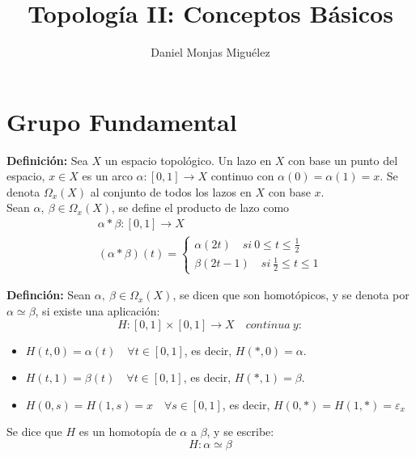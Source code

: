 \documentclass{article}
\author{Daniel Monjas Miguélez}
\title{Topología II: Conceptos Básicos}
\begin{document}
\maketitle
\newpage
\tableofcontents
\newpage

\section{Grupo Fundamental}
\textbf{Definición:} Sea $X$ un espacio topológico. Un lazo en $X$ con base un punto del espacio, $x\in X$ es un arco $\alpha:[0,1]\rightarrow X$ continuo con $\alpha(0)=\alpha(1)=x$. Se denota $\Omega_{x}(X)$ al conjunto de todos los lazos en $X$ con base $x$. \\

Sean $\alpha,\:\beta\in \Omega_{x}(X)$, se define el producto de lazo como
\begin{gather*}
\alpha*\beta:[0,1]\rightarrow X \\
(\alpha*\beta)(t)=\left\lbrace \begin{array}{c}
\alpha(2t)\quad si\:0\leq t\leq \frac{1}{2} \\
\beta(2t-1)\quad si\:\frac{1}{2}\leq t\leq 1
\end{array} \right.
\end{gather*}

\textbf{Definción:} Sean $\alpha,\:\beta\in \Omega_x(X)$, se dicen que son homotópicos, y se denota por $\alpha\simeq \beta$, si existe una aplicación:
\begin{equation*}
H:[0,1]\times[0,1]\rightarrow X\quad continua\:y:
\end{equation*}

\begin{itemize}
\item $H(t,0)=\alpha(t)\quad \forall t\in [0,1]$, es decir, $H(*,0)=\alpha$.

\item $H(t,1)=\beta(t)\quad \forall t\in [0,1]$, es decir, $H(*,1)=\beta$.

\item $H(0,s)=H(1,s)=x\quad \forall s\in [0,1]$, es decir, $H(0,*)=H(1,*)=\varepsilon_x$
\end{itemize}

Se dice que $H$ es un homotopía de $\alpha$ a $\beta$, y se escribe:
\begin{equation*}
H:\alpha\simeq \beta
\end{equation*}
\end{document}
